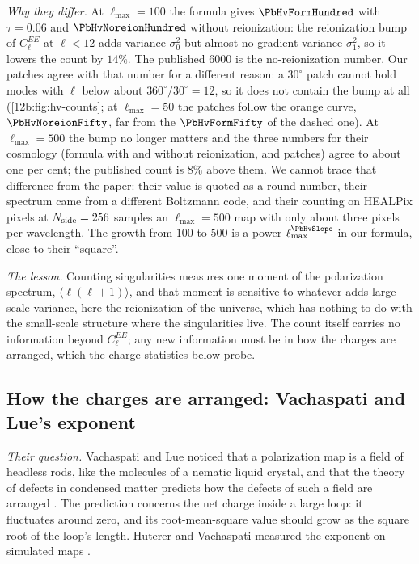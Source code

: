 \emph{Why they differ.} At $\ell_{\max}=100$ the formula gives $\PbHvFormHundred$ with $\tau=0.06$ and
$\PbHvNoreionHundred$ without reionization: the reionization bump of $C_\ell^{EE}$ at $\ell<12$ adds variance $\sigma_0^2$
but almost no gradient variance $\sigma_1^2$, so it lowers the count by $14\%$. The published $6000$ is the
no-reionization number. Our patches agree with that number for a different reason: a $30^\circ$ patch cannot hold
modes with $\ell$ below about $360^\circ/30^\circ=12$, so it does not contain the bump at all
(\cref{12b:fig:hv-counts}; at $\ell_{\max}=50$ the patches follow the orange curve, $\PbHvNoreionFifty$, far from the
$\PbHvFormFifty$ of the dashed one). At $\ell_{\max}=500$ the bump no longer matters and the three numbers for their cosmology (formula with and
without reionization, and patches) agree to about one per cent; the published count is $8\%$ above them. We cannot trace that difference from the paper: their
value is quoted as a round number, their spectrum came from a different Boltzmann code, and their counting on HEALPix
pixels at $N_{\rm side}=256$ samples an $\ell_{\max}=500$ map with only about three pixels per wavelength. The growth
from $100$ to $500$ is a power $\ell_{\max}^{\PbHvSlope}$ in our formula, close to their ``square''.

\emph{The lesson.} Counting singularities measures one moment of the polarization spectrum, $\langle\ell(\ell+1)\rangle$,
and that moment is sensitive to whatever adds large-scale variance, here the reionization of the universe, which has
nothing to do with the small-scale structure where the singularities live. The count itself carries no information
beyond $C_\ell^{EE}$; any new information must be in how the charges are arranged, which the charge statistics below probe.

\subsection{How the charges are arranged: Vachaspati and Lue's exponent}
\label{12b:sec:repro-charge}

\emph{Their question.} Vachaspati and Lue noticed that a polarization map is a field of headless rods, like the
molecules of a nematic liquid crystal, and that the theory of defects in condensed matter predicts how the defects of
such a field are arranged \cite{VachaspatiLue2003}. The prediction concerns the net charge inside a large loop: it
fluctuates around zero, and its root-mean-square value should grow as the square root of the loop's length. Huterer and
Vachaspati measured the exponent on simulated maps \cite{HutererVachaspati2005}.

